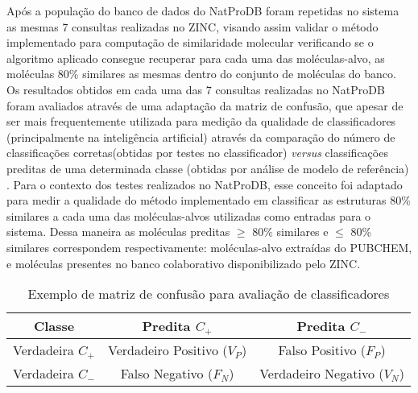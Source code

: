 Após a população do banco de dados do NatProDB foram repetidas no sistema as mesmas 7 consultas realizadas no ZINC, visando assim validar o método implementado para computação de similaridade molecular verificando se o algoritmo aplicado consegue recuperar para cada uma das moléculas-alvo, as moléculas 80\% similares as mesmas dentro do conjunto de moléculas do banco. Os resultados obtidos em cada uma das 7 consultas realizadas no NatProDB foram avaliados através de uma adaptação da matriz de confusão, que apesar de ser mais frequentemente utilizada para medição da qualidade de classificadores (principalmente na inteligência artificial) através da comparação do número de classificações corretas(obtidas por testes no classificador) \textit{versus} classificações preditas de uma determinada classe (obtidas por análise de modelo de referência) \cite{davis2006relationship}. Para o contexto dos testes realizados no NatProDB, esse conceito foi adaptado para medir a qualidade do método implementado em classificar as estruturas 80\% similares a cada uma das moléculas-alvos utilizadas como entradas para o sistema. Dessa maneira as moléculas preditas $\geq$ 80\% similares e $\leq$ 80\% similares correspondem respectivamente: moléculas-alvo extraídas do PUBCHEM, e moléculas presentes no banco colaborativo disponibilizado pelo ZINC.

\begin{table}[!htb]
	\centering
	\footnotesize
	\caption[Matriz de Confusão]{Exemplo de matriz de confusão para avaliação de classificadores}
	\label{tab:matrizconfusao}	
	\begin{tabular}{|c|c|c|}
		\hline \SPACE
		\textbf{Classe}&\textbf{Predita $C_+$} & \textbf{Predita $C_-$} \\ \hline \SPACE
	Verdadeira $C_+$  &	Verdadeiro Positivo ($V_P$) & Falso Positivo ($F_P$) \\ \hline \SPACE
	Verdadeira $C_-$  & Falso Negativo ($F_N$) & Verdadeiro Negativo ($V_N$)\\ \hline 
	\end{tabular}
\end{table}  

